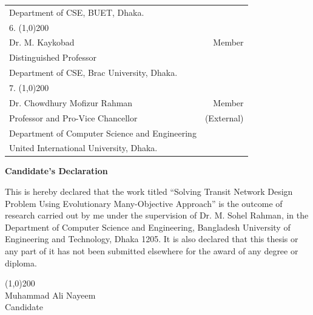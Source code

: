 \begin{singlespace}
{\begin{spacing}{0.5}
\begin{tabular}{p{12cm} r }
	Department of CSE, BUET, Dhaka.  & \\
 	\vspace{0.3cm}
 	6. \line(1,0){200} &  \\
 	Dr. M. Kaykobad  & Member\\ 
 	Distinguished Professor & \\
 	Department of CSE, Brac University, Dhaka.  & \\
 	\vspace{0.3cm}
 	7. \line(1,0){200} &  \\
 	Dr. Chowdhury Mofizur Rahman & Member\\ 
 	Professor and Pro-Vice Chancellor & (External)\\
 	Department of Computer Science and Engineering & \\
 	United International University, Dhaka. & \\
 \end{tabular}
 \end{spacing}
}
\end{singlespace}
 \newpage
 \begin{center}
 \LARGE \textbf{Candidate's Declaration}
 \end{center}
 \vspace{3cm}
 This is hereby declared that the work titled ``Solving Transit Network Design Problem Using Evolutionary Many-Objective Approach'' is the outcome of research carried out by me under the supervision of Dr. M. Sohel Rahman, in the Department of Computer Science and Engineering,
 Bangladesh University of Engineering and Technology, Dhaka 1205. 
 It is also declared that this thesis or any part of it has not been submitted elsewhere for the award of any degree or diploma. \\
 \vspace{4cm}
\begin{center}
 \line(1,0){200}\\
 \large
 Muhammad Ali Nayeem \\
 Candidate
\end{center}
 

 
 
 